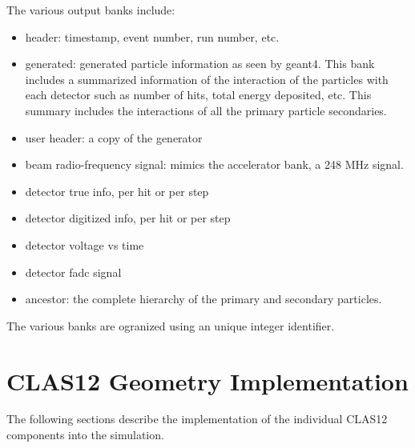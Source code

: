 The various output banks include:

\begin{itemize}
	\item header: timestamp, event number, run number, etc.
	\item generated: generated particle information as seen by geant4. This bank includes a summarized information of the interaction of
                     the particles with each detector such as number of hits, total energy deposited, etc. This summary includes
                     the interactions of all the primary particle secondaries.
	\item user header: a copy of the generator
	\item beam radio-frequency signal: mimics the accelerator bank, a 248 MHz signal.
	\item detector true info, per hit or per step
	\item detector digitized info, per hit or per step
	\item detector voltage vs time
	\item detector fadc signal
\item ancestor: the complete hierarchy of the primary and secondary particles.
\end{itemize}

The various banks are ogranized using an unique integer identifier.


\section{CLAS12 Geometry Implementation}

The following sections describe the implementation of the individual CLAS12 components into the simulation.
